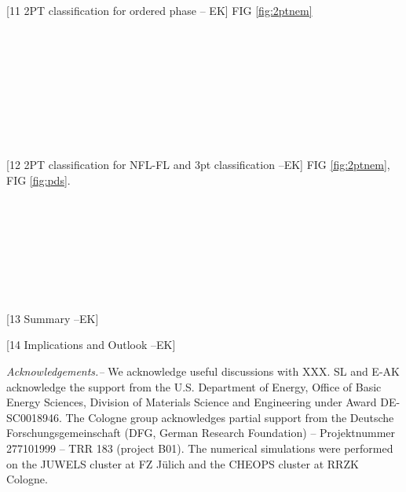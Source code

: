 \documentclass[amsmath,amssymb, aps, prx, longbibliography, twocolumn]{revtex4-1}
\begin{document}
[11 2PT classification for ordered phase -- EK]
FIG \ref{fig:2ptnem}
\\
\\
\\
\\
\\
\\
\\
\\
\\
\\


[12 2PT classification for NFL-FL and 3pt classification --EK]
FIG \ref{fig:2ptnem}, FIG \ref{fig:pds}.
\\
\\
\\
\\
\\
\\
\\
\\
\\

[13 Summary --EK]

[14 Implications and Outlook --EK]



{\it Acknowledgements.--} 
We acknowledge useful discussions with XXX. SL and E-AK acknowledge the support from the U.S. Department of Energy, Office of Basic Energy Sciences, Division of Materials Science and Engineering under Award DE-SC0018946.
The Cologne group acknowledges partial support from the Deutsche Forschungsgemeinschaft (DFG, German Research Foundation) -- Projektnummer 277101999 -- TRR 183 (project B01).
The numerical simulations were performed on the JUWELS cluster at FZ J\"ulich and the CHEOPS cluster at RRZK Cologne.


%

\appendix
\end{document}

